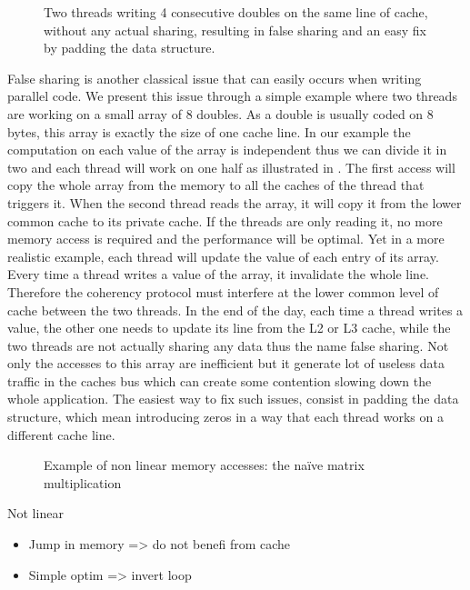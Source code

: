 \begin{figure}[htb]
    \centering
    
    \caption[Example of false sharing.]{Two threads writing 4 consecutive doubles on the same line of cache, without any actual sharing, resulting in false sharing and an easy fix by padding the data structure.}
    \label{fig:false-sharing}
\end{figure}

False sharing is another classical issue that can easily occurs when writing parallel code.
We present this issue through a simple example where two threads are working on a small array of $8$ doubles.
As a double is usually coded on $8$ bytes, this array is exactly the size of one cache line.
In our example the computation on each value of the array is independent thus we can divide it in two and each thread will  work on one half as illustrated in .
The first access will copy the whole array from the memory to all the caches of the thread that triggers it.
When the second thread reads the array, it will copy it from the lower common cache to its private cache.
If the threads are only reading it, no more memory access is required and the performance will be optimal.
Yet in a more realistic example, each thread will update the value of each entry of its array.
Every time a thread writes a value of the array, it invalidate the whole line.
Therefore the coherency protocol must interfere at the lower common level of cache between the two threads.
In the end of the day, each time a thread writes a value, the other one needs to update its line from the L2 or L3 cache, while the two threads are not actually sharing any data thus the name false sharing.
Not only the accesses to this array are inefficient but it generate lot of useless data traffic in the caches bus which can create some contention slowing down the whole application.
The easiest way to fix such issues, consist in padding the data structure, which mean introducing zeros in a way that each thread works on a different cache line.

\begin{figure}[htb]
    \centering
    
    \caption{Example of non linear memory accesses: the naïve matrix multiplication}
    \label{fig:mat-mult}
\end{figure}

Not linear
\begin{itemize}
    \item Jump in memory => do not benefi from cache
    \item Simple optim => invert loop
\end{itemize}

